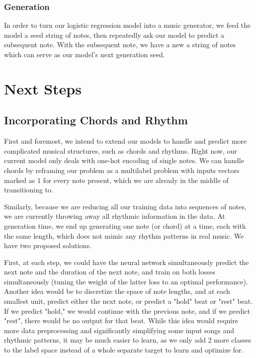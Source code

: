 \documentclass[twoside,twocolumn]{article}
\begin{document}
\subsubsection{Generation}
In order to turn our logistic regression model into a music generator, we feed the model a seed string of notes, then repeatedly ask our model to predict a subsequent note. With the subsequent note, we have a new a string of notes which can serve as our model's next generation seed.


\section{Next Steps}

\subsection{Incorporating Chords and Rhythm}
First and foremost, we intend to extend our models to handle and predict more complicated musical structures, such as chords and rhythms. Right now, our current model only deals with one-hot encoding of single notes. We can handle chords by reframing our problem as a multilabel problem with inputs vectors marked as 1 for every note present, which we are already in the middle of transitioning to.

Similarly, because we are reducing all our training data into sequences of notes, we are currently throwing away all rhythmic information in the data. At generation time, we end up generating one note (or chord) at a time, each with the same length, which does not mimic any rhythm patterns in real music. We have two proposed solutions.

First, at each step, we could have the neural network simultaneously predict the next note and the duration of the next note, and train on both losses simultaneously (tuning the weight of the latter loss to an optimal performance). Another idea would be to discretize the space of note lengths, and at each smallest unit, predict either the next note, or predict a "hold" beat or "rest" beat. If we predict "hold," we would continue with the previous note, and if we predict "rest", there would be no output for that beat. While this idea would require more data preprocessing and significantly simplifying some input songs and rhythmic patterns, it may be much easier to learn, as we only add 2 more classes to the label space instead of a whole separate target to learn and optimize for.
\end{document}
